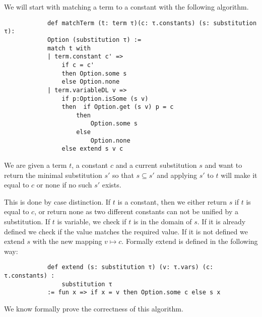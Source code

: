 \documentclass{article}
\begin{document}
        We will start with matching a term to a constant with the following algorithm.

        \begin{lstlisting}
            def matchTerm (t: term τ)(c: τ.constants) (s: substitution τ):
            Option (substitution τ) :=
            match t with
            | term.constant c' =>
                if c = c'
                then Option.some s
                else Option.none
            | term.variableDL v =>
                if p:Option.isSome (s v)
                then  if Option.get (s v) p = c
                    then
                        Option.some s
                    else
                        Option.none
                else extend s v c
        \end{lstlisting}

        We are given a term $t$, a constant $c$ and a current substitution $s$ and want to return the minimal substitution $s'$ so that $s \subseteq s'$ and applying $s'$ to $t$ will make it equal to $c$ or none if no such $s'$ exists.

        This is done by case distinction. If $t$ is a constant, then we either return $s$ if $t$ is equal to $c$, or return none as two different constants can not be unified by a substitution. If $t$ is variable, we check if $t$ is in the domain of $s$. If it is already defined we check if the value matches the required value. If it is not defined we extend $s$ with the new mapping $v \mapsto c$.
        Formally extend is defined in the following way:

        \begin{lstlisting}
            def extend (s: substitution τ) (v: τ.vars) (c: τ.constants) :
                substitution τ 
            := fun x => if x = v then Option.some c else s x
        \end{lstlisting}

        We know formally prove the correctness of this algorithm.
\end{document}
